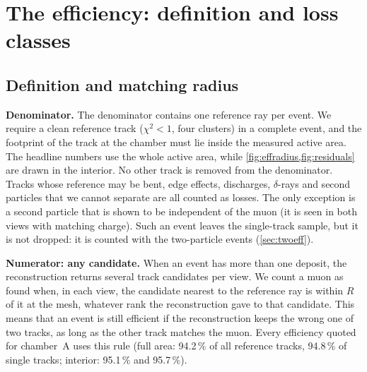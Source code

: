 \section{The efficiency: definition and loss classes}\label{app:effdef}

\subsection{Definition and matching radius}
\textbf{Denominator.} The denominator contains one reference ray per event. We require a clean reference track
($\chi^2<1$, four clusters) in a complete event, and the footprint of the track at the chamber must lie inside the
measured active area. The headline numbers use the whole active area, while \cref{fig:effradius,fig:residuals} are
drawn in the interior. No other track is removed from the denominator. Tracks whose reference may be bent, edge
effects, discharges, $\delta$-rays and second particles that we cannot separate are all counted as losses. The only
exception is a second particle that is shown to be independent of the muon (it is seen in both views with matching
charge). Such an event leaves the single-track sample, but it is not dropped: it is counted with the two-particle
events (\cref{sec:twoeff}).

\textbf{Numerator: any candidate.} When an event has more than one deposit, the reconstruction returns several track
candidates per view. We count a muon as found when, in each view, the candidate nearest to the reference ray is within
$R$ of it at the mesh, whatever rank the reconstruction gave to that candidate. This means that an event is still
efficient if the reconstruction keeps the wrong one of two tracks, as long as the other track matches the muon. Every
efficiency quoted for chamber~A uses this rule (full area: 94.2\,\% of all reference tracks, 94.8\,\% of single tracks;
interior: 95.1\,\% and 95.7\,\%).

